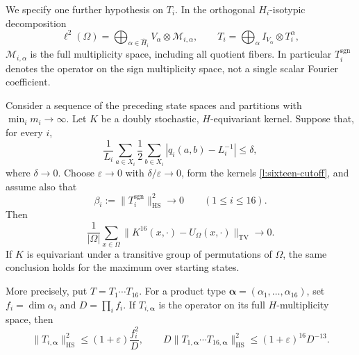 We specify one further hypothesis on $T_i$.  In the orthogonal
$H_i$-isotypic decomposition
\[
 \ell^2(\Omega)=\bigoplus_{\alpha\in\widehat H_i}
                 V_\alpha\otimes\mathcal M_{i,\alpha},
 \qquad
 T_i=\bigoplus_\alpha I_{V_\alpha}\otimes T_i^\alpha,
\]
$\mathcal M_{i,\alpha}$ is the full multiplicity space, including all
quotient fibers.  In particular $T_i^{\mathrm{sgn}}$ denotes the
operator on the sign multiplicity space, not a single scalar Fourier
coefficient.

\begin{theorem}
\label{l:equivariant-sixteen}
Consider a sequence of the preceding state spaces and partitions with
$\min_i m_i\to\infty$.  Let $K$ be a doubly stochastic,
$H$-equivariant kernel.  Suppose that, for every $i$,
\begin{equation}
 \frac1{L_i}\sum_{a\in X_i}
 \frac12\sum_{b\in X_i}|q_i(a,b)-L_i^{-1}|\le\delta,
 \label{l:sixteen-marginal-input}
\end{equation}
where $\delta\to0$.  Choose $\varepsilon\to0$ with
$\delta/\varepsilon\to0$, form the kernels
\eqref{l:sixteen-cutoff}, and assume also that
\begin{equation}
 \beta_i:=\|T_i^{\mathrm{sgn}}\|_{\mathrm{HS}}^2\longrightarrow0
 \qquad(1\le i\le16).
 \label{l:sixteen-sign-input}
\end{equation}
Then
\[
 \frac1{|\Omega|}\sum_{x\in\Omega}
       \|K^{16}(x,\cdot)-U_\Omega(x,\cdot)\|_{\mathrm{TV}}
 \longrightarrow0.
\]
If $K$ is equivariant under a transitive group of permutations of
$\Omega$, the same conclusion holds for the maximum over starting
states.

More precisely, put $T=T_1\cdots T_{16}$.  For a product type
$\boldsymbol\alpha=(\alpha_1,\ldots,\alpha_{16})$, set
$f_i=\dim\alpha_i$ and $D=\prod_i f_i$.  If
$T_{i,\boldsymbol\alpha}$ is the operator on its full
$H$-multiplicity space, then
\begin{equation}
 \|T_{i,\boldsymbol\alpha}\|_{\mathrm{HS}}^2
       \le(1+\varepsilon)\frac{f_i^2}{D},\qquad
 D\|T_{1,\boldsymbol\alpha}\cdots
             T_{16,\boldsymbol\alpha}\|_{\mathrm{HS}}^2
       \le(1+\varepsilon)^{16}D^{-13}.
 \label{l:sixteen-type-bounds}
\end{equation}
\end{theorem}

